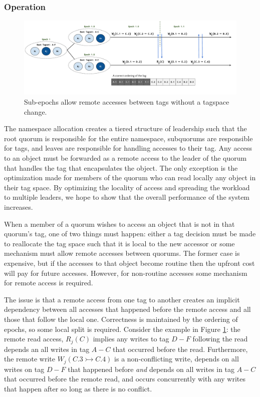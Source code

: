 \documentclass{article}
\begin{document}
\subsubsection{Operation}
\label{sec:hierarchical_operation}

\begin{figure}
    \centering
        \includegraphics[width=.9\textwidth]{figures/subepoch}
        \caption{Sub-epochs allow remote accesses between tags without a tagspace change.}
        \label{fig:subepoch}
\end{figure}

The namespace allocation creates a tiered structure of leadership such that the root quorum is responsible for the entire namespace, subquorums are responsible for tags, and leaves are responsible for handling accesses to their tag. Any access to an object must be forwarded as a remote access to the leader of the quorum that handles the tag that encapsulates the object. The only exception is the optimization made for members of the quorum who can read locally any object in their tag space. By optimizing the locality of access and spreading the workload to multiple leaders, we hope to show that the overall performance of the system increases.

When a member of a quorum wishes to access an object that is not in that quorum's tag, one of two things must happen: either a tag decision must be made to reallocate the tag space such that it is local to the new accessor or some mechanism must allow remote accesses between quorums. The former case is expensive, but if the accesses to that object become routine then the upfront cost will pay for future accesses. However, for non-routine accesses some mechanism for remote access is required.

The issue is that a remote access from one tag to another creates an implicit dependency between all accesses that happened before the remote access and all those that follow the local one. Correctness is maintained by the ordering of epochs, so some local split is required. Consider the example in Figure \ref{fig:subepoch}: the remote read access, $R_j(C)$ implies any writes to tag $D-F$ following the read depends an all writes in tag $A-C$ that occurred before the read. Furthermore, the remote write $W_j(C.3 \rightarrowtail C.4)$ is a non-conflicting write, depends on all writes on tag $D-F$ that happened before \textit{and} depends on all writes in tag $A-C$ that occurred before the remote read, and occurs concurrently with any writes that happen after so long as there is no conflict.
\end{document}
